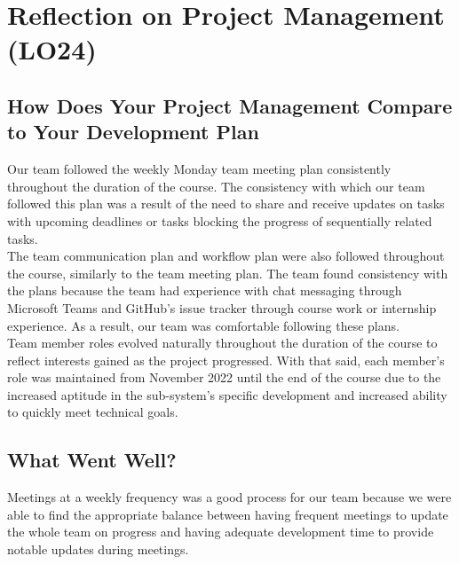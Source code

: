 \documentclass[12pt,titlepage]{article}
\begin{document}
\section{Reflection on Project Management (LO24)}


\subsection{How Does Your Project Management Compare to Your Development Plan}


Our team followed the weekly Monday team meeting plan consistently throughout the duration of the course. The consistency with which our team followed this plan was a result of the need to share and receive updates on tasks with upcoming deadlines or tasks blocking the progress of sequentially related tasks. \\

The team communication plan and workflow plan were also followed throughout the course, similarly to the team meeting plan. The team found consistency with the plans because the team had experience with chat messaging through Microsoft Teams and GitHub's issue tracker through course work or internship experience. As a result, our team was comfortable following these plans. \\

Team member roles evolved naturally throughout the duration of the course to reflect interests gained as the project progressed. With that said, each member's role was maintained from November 2022 until the end of the course due to the increased aptitude in the sub-system's specific development and increased ability to quickly meet technical goals. \\



\subsection{What Went Well?}


Meetings at a weekly frequency was a good process for our team because we were able to find the appropriate balance between having frequent meetings to update the whole team on progress and having adequate development time to provide notable updates during meetings. \\
\end{document}
